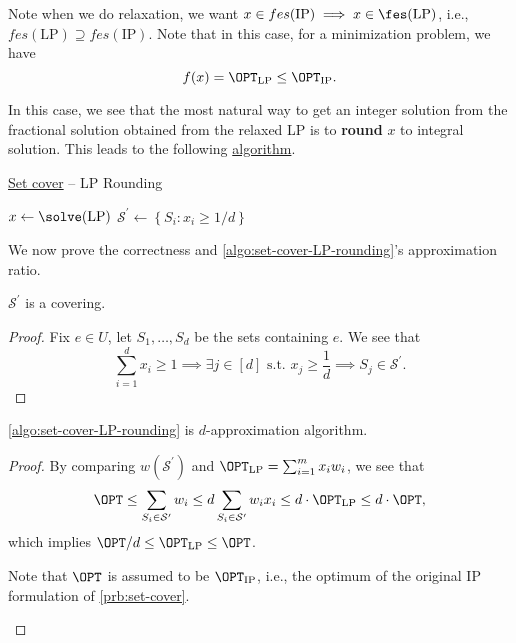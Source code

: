 \begin{note}
	Note when we do relaxation, we want \(x\in fes(\text{IP}) \implies x\in \fes(\text{LP})\), i.e., \(fes(\text{LP})\supseteq fes(\text{IP})\). Note that in this case, for a minimization problem, we have
	\[
		f(x) = \OPT_\text{LP} \leq \OPT_\text{IP}.
	\]
\end{note}

In this case, we see that the most natural way to get an integer solution from the fractional solution obtained from the relaxed LP is to \textbf{round} \(x\) to integral solution. This leads to the following \hyperref[algo:set-cover-LP-rounding]{algorithm}.

\begin{algorithm}[H]\label{algo:set-cover-LP-rounding}
	\DontPrintSemicolon{}
	\caption{\hyperref[prb:set-cover]{Set cover} -- LP Rounding}
	\BlankLine
	\(x\gets\solve(\text{LP})\)
	\(\mathcal{S} ^\prime \gets \left\{ S_i \colon x_{i} \geq 1 / d \right\}\)\;
	\;
\end{algorithm}

We now prove the correctness and \autoref{algo:set-cover-LP-rounding}'s approximation ratio.
\begin{lemma}
	\(\mathcal{S} ^\prime \) is a covering.
\end{lemma}
\begin{proof}
	Fix \(e\in U\), let \(S_1, \dots  , S_d\) be the sets containing \(e\). We see that
	\[
		\sum_{i=1}^{d} x_{i} \geq 1\implies \exists j\in[d] \text{ s.t. } x_j \geq \frac{1}{d} \implies S_j\in \mathcal{S} ^\prime.
	\]
\end{proof}

\begin{theorem}\label{thm:set-cover-LP-rounding}
	\autoref{algo:set-cover-LP-rounding} is \(d\)-approximation algorithm.
\end{theorem}
\begin{proof}
	By comparing \(w(\mathcal{S} ^\prime )\) and \(\OPT_\text{LP} = \sum_{i=1}^{m} x_{i} w_{i}\), we see that
	\[
		\OPT \leq \sum_{S_i\in \mathcal{S} ^\prime }w_i \leq d \sum_{S_i\in \mathcal{S} ^\prime }w_{i} x_{i} \leq d\cdot \OPT_\text{LP} \leq d\cdot \OPT,
	\]
	which implies \(\OPT / d\leq \OPT_\text{LP} \leq \OPT\).

	\begin{note}
		Note that \(\OPT\) is assumed to be \(\OPT_{\text{IP}}\), i.e., the optimum of the original IP formulation of \autoref{prb:set-cover}.
	\end{note}
\end{proof}

